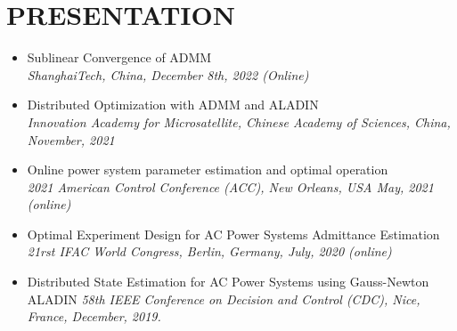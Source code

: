\documentclass[paper=a4,fontsize=11pt]{scrartcl} %
\newcommand{\NewPart}[1]{\section*{\uppercase{#1}}}
\begin{document}
\NewPart{PRESENTATION}{}
\begin{itemize}
	\item {
		{Sublinear Convergence of ADMM}\\
		\emph{ShanghaiTech, China, December 8th, 2022 (Online)	} }
	
	
	\item  {
		{Distributed Optimization with ADMM and	ALADIN}\\
		\emph{Innovation Academy for Microsatellite, Chinese Academy of Sciences, China, November, 2021 	} }
	\item  {
		{Online power system parameter estimation and optimal operation}\\
		\emph{2021 American Control Conference (ACC), New Orleans, USA May, 2021 (online)
	} }
	
	\item  {
		Optimal Experiment Design for AC Power Systems Admittance Estimation\\
		\emph{21rst IFAC World Congress, Berlin, Germany, July, 2020 (online)
	} }
	
	\item  {
		Distributed State Estimation for AC Power Systems using Gauss-Newton ALADIN 
		\emph{58th IEEE Conference on Decision and Control (CDC),
			Nice, France, December, 2019.} }
\end{itemize}
\end{document}
